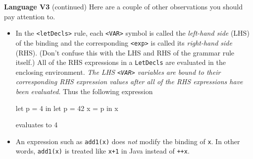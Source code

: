 \begin{minipage}[t]{\sw}
\slidenumber
\LARGE
{\bf Language V3} (continued)\exx
{\large
\emm{}
}\exx
Here are a couple of other observations you should pay attention to.
\begin{itemize}
\item
  In the \verb'<letDecls>' rule, each \verb'<VAR>' symbol
  is called the {\em left-hand side} (LHS) of the binding
  and the corresponding \verb'<exp>'
  is called its {\em right-hand side} (RHS).
  (Don't confuse this with the LHS and RHS of the grammar rule itself.)
  All of the RHS expressions in a \verb'LetDecls' are evaluated
  in the enclosing environment.
  {\em The LHS \verb'<VAR>' variables are bound
  to their corresponding RHS expression values
  after all of the RHS expressions have been evaluated}.
  Thus the following expression
  {\Large
  \begin{qv}
  let p = 4
  in
    let p = 42 x = p
    in x
  \end{qv}
  }
  evaluates to 4
\item
  An expression such as \verb'add1(x)' does {\em not} modify
  the binding of \verb'x'.
  In other words, \verb'add1(x)' is treated like \verb'x+1'
  in Java instead of \verb'++x'.
\end{itemize}
\end{minipage}
